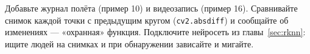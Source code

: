 \begin{taskbox}
Добавьте журнал полёта (пример 10) и видеозапись (пример 16). Сравнивайте снимок каждой точки с предыдущим кругом (\verb|cv2.absdiff|) и сообщайте об изменениях --- «охранная» функция. Подключите нейросеть из главы~\ref{sec:rknn}: ищите людей на снимках и при обнаружении зависайте и мигайте.
\end{taskbox}
